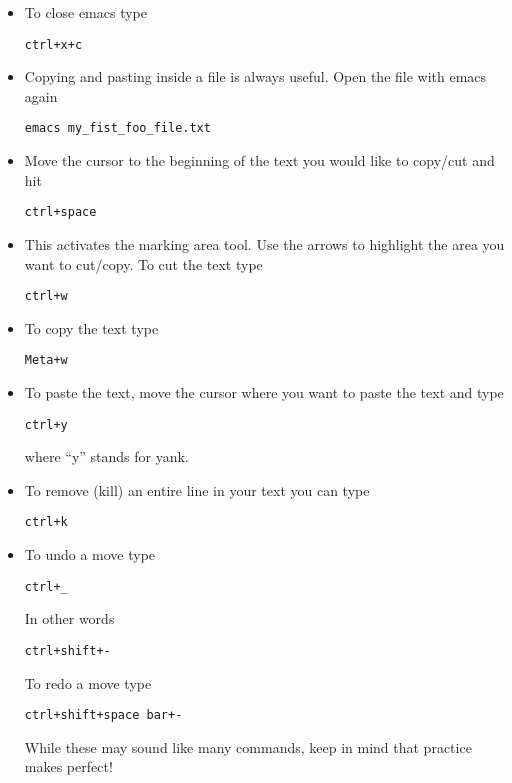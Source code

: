 \documentclass[aps,showpacs,prd,notitlepage,preprintnumbers,amsmath,amssymb,letterpaper]{revtex4}
\begin{document}
\begin{itemize}
\item To close emacs type

\begin{verbatim}
ctrl+x+c
\end{verbatim}

\item Copying and pasting inside a file is always useful. Open the file with emacs again

\begin{verbatim}
emacs my_fist_foo_file.txt
\end{verbatim}

\item Move the cursor to the beginning of the text you would like to copy/cut and hit

\begin{verbatim}
ctrl+space
\end{verbatim}

\item This activates the marking area tool. Use the arrows to highlight the area you want to cut/copy.
To cut the text type

\begin{verbatim}
ctrl+w
\end{verbatim}

\item To copy the text type

\begin{verbatim}
Meta+w
\end{verbatim}


\item To paste the text, move the cursor where you want to paste the text and type

\begin{verbatim}
ctrl+y
\end{verbatim}

where ``y'' stands for yank.

\item To remove (kill) an entire line in your text you can type

\begin{verbatim}
ctrl+k
\end{verbatim}

\item To undo a move type

\begin{verbatim}
ctrl+_
\end{verbatim}

In other words

\begin{verbatim}
ctrl+shift+-
\end{verbatim}

To redo a move type

\begin{verbatim}
ctrl+shift+space bar+-
\end{verbatim}

While these may sound like many commands, keep in mind that practice makes perfect!
\end{itemize}
\end{document}
